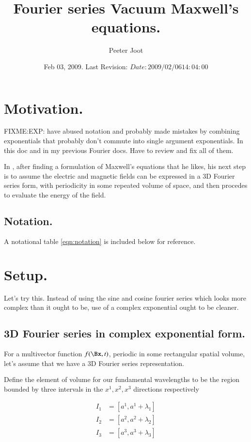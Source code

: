 \documentclass{article}
\title{ Fourier series Vacuum Maxwell's equations. }
\author{Peeter Joot}
\date{ Feb 03, 2009.  Last Revision: $Date: 2009/02/06 14:04:00 $ }
\begin{document}
\maketitle{}

\tableofcontents

\section{ Motivation. }


FIXME:EXP: have abused notation and probably made mistakes by combining exponentials that probably don't commute into single argument exponentials.  In this doc and in my previous Fourier docs.  Have to review and fix all of them.



In \cite{bohm1989qt}, 
after finding a formulation of Maxwell's equations that he likes, his next
step is to assume the electric and magnetic fields can be expressed in 
a 3D Fourier series form, with periodicity in some repeated volume 
of space, and then procedes to evaluate the energy of the 
field.

\subsection{ Notation. }

A notational table 
\ref{eqn:notation}
is included below for reference.

\section{ Setup. }

Let's try this.  Instead of using the sine and cosine fourier series
which looks more complex than it ought to be, use of a complex exponential
ought to be cleaner.

\subsection{ 3D Fourier series in complex exponential form. }

For a multivector function $f(\Bx, t)$, periodic in some rectangular spatial volume, let's assume that we have a
3D Fourier series representation.

Define the element of volume for our fundamental wavelengths to be the region bounded by three intervals in the $x^1, x^2, x^3$ directions respectively

\begin{align*}
I_1 &= [ a^1, a^1 + \lambda_1 ] \\
I_2 &= [ a^2, a^2 + \lambda_2 ] \\
I_3 &= [ a^3, a^3 + \lambda_3 ] \\
\end{align*}
\end{document}
